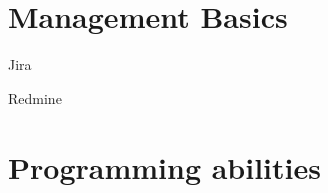 \documentclass{cv}
\begin{document}
\pagebreak

\section* {Management Basics}
  \begin{multicols}{2}
    \begin {list}{\textbullet}{\itemsep=0mm}
      \item Jira
        \columnbreak
      \item Redmine
    \end{list}
  \end{multicols}


\section* {Programming abilities}
\end{document}
